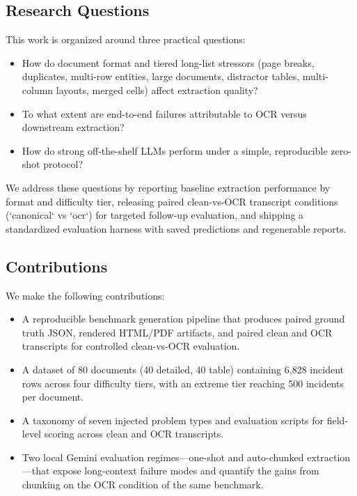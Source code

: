 \subsection{Research Questions}
This work is organized around three practical questions:
\begin{itemize}
    \item How do document format and tiered long-list stressors (page breaks, duplicates, multi-row entities, large documents, distractor tables, multi-column layouts, merged cells) affect extraction quality?
    \item To what extent are end-to-end failures attributable to OCR versus downstream extraction?
    \item How do strong off-the-shelf LLMs perform under a simple, reproducible zero-shot protocol?
\end{itemize}

We address these questions by reporting baseline extraction performance by format and difficulty tier, releasing paired clean-vs-OCR transcript conditions (`canonical` vs `ocr`) for targeted follow-up evaluation, and shipping a standardized evaluation harness with saved predictions and regenerable reports.

\subsection{Contributions}
We make the following contributions:
\begin{itemize}
    \item A reproducible benchmark generation pipeline that produces paired ground truth JSON, rendered HTML/PDF artifacts, and paired clean and OCR transcripts for controlled clean-vs-OCR evaluation.
    \item A dataset of 80 documents (40 detailed, 40 table) containing 6{,}828 incident rows across four difficulty tiers, with an extreme tier reaching 500 incidents per document.
    \item A taxonomy of seven injected problem types and evaluation scripts for field-level scoring across clean and OCR transcripts.
    \item Two local Gemini evaluation regimes---one-shot and auto-chunked extraction---that expose long-context failure modes and quantify the gains from chunking on the OCR condition of the same benchmark.
\end{itemize}
